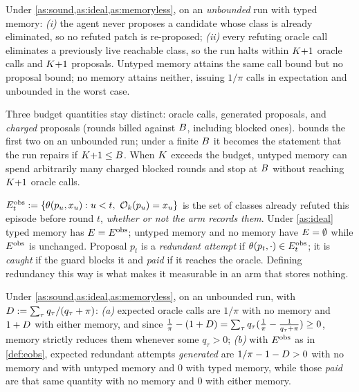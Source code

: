 \begin{theorem}
\label{thm:nonrep}
Under \cref{as:sound,as:ideal,as:memoryless}, on an \emph{unbounded} run with
typed memory: \emph{(i)} the agent never proposes a candidate whose class is
already eliminated, so no refuted patch is re-proposed; \emph{(ii)} every
refuting oracle call eliminates a previously live reachable class, so the run
halts within $K{+}1$ oracle calls and $K{+}1$ proposals. Untyped
memory attains the same call bound but no proposal bound; no memory attains
neither, issuing $1/\pi$ calls in expectation and unbounded in the worst case.
\end{theorem}

Three budget quantities stay distinct: oracle calls, generated proposals, and
\emph{charged} proposals (rounds billed against $B$, including blocked
ones).  bounds the first two on an unbounded run; under a
finite $B$ it becomes the statement that the run repairs if
$K{+}1 \le B$. When $K$ exceeds the budget, untyped memory
can spend arbitrarily many charged blocked rounds and stop at $B$ without
reaching $K{+}1$ oracle calls.

\begin{definition}
\label{def:eobs}
$\elimobs_t := \{\ttype(p_u, x_u) : u < t,\ \Ok(p_u) = x_u\}$ is the set of
classes already refuted this episode before round $t$, \emph{whether or not the
arm records them}. Under \cref{as:ideal} typed memory has $E = E^{\mathrm{obs}}$;
untyped memory and no memory have $E = \emptyset$ while $E^{\mathrm{obs}}$ is
unchanged. Proposal $p_t$ is a \emph{redundant attempt} if
$\theta(p_t, \cdot) \in E^{\mathrm{obs}}_t$; it is \emph{caught} if the guard blocks it
and \emph{paid} if it reaches the oracle. Defining redundancy this way is what
makes it measurable in an arm that stores nothing.
\end{definition}

\begin{theorem}
\label{thm:redund}
Under \cref{as:sound,as:ideal,as:memoryless}, on an unbounded run, with
$D := \sum_{\tau} q_\tau/(q_\tau + \pi)$:
\emph{(a)} expected oracle calls are $1/\pi$ with no memory and $1 + D$
with either memory, and since
$\frac{1}{\pi} - (1 + D) = \sum_\tau q_\tau(\frac{1}{\pi} -
\frac{1}{q_\tau + \pi}) \ge 0$, memory strictly reduces them whenever some
$q_\tau > 0$;
\emph{(b)} with $E^{\mathrm{obs}}$ as in \cref{def:eobs}, expected redundant attempts
\emph{generated} are $1/\pi - 1 - D > 0$ with no memory and with untyped
memory and $0$ with typed memory, while those \emph{paid} are that same
quantity with no memory and $0$ with either memory.
\end{theorem}

